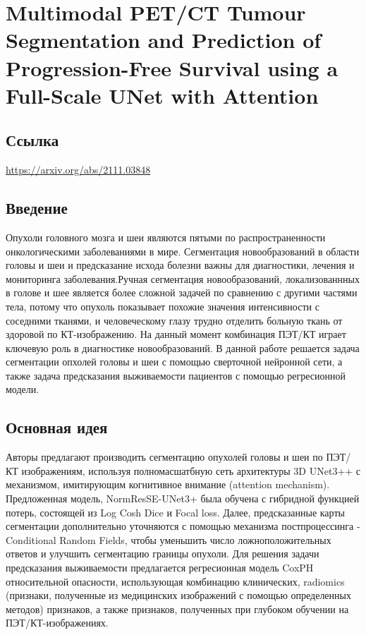 \section{Multimodal PET/CT Tumour
Segmentation and Prediction of
Progression-Free Survival using a
Full-Scale UNet with Attention}

\subsection*{Ссылка} \url{https://arxiv.org/abs/2111.03848}
\subsection*{Введение}
Опухоли головного мозга и шеи являются пятыми по распространенности 
онкологическими заболеваниями в мире. Сегментация новообразований 
в области головы и шеи и предсказание исхода болезни важны 
для диагностики, лечения и мониторинга заболевания.Ручная сегментация
новообразований, локализованнных в голове и шее является более сложной задачей по 
сравнению с другими частями тела, потому что опухоль показывает похожие 
значения интенсивности с соседними тканями, и человеческому глазу трудно отделить 
больную ткань от здоровой по КТ-изображению. На данный момент комбинация ПЭТ/КТ 
играет ключевую роль в диагностике новообразований. В данной работе
решается задача сегментации опхолей головы и шеи с помощью 
сверточной нейронной сети, а также задача предсказания выживаемости пациентов с помощью 
регресионной модели.
\subsection*{Основная идея}
Авторы предлагают производить сегментацию опухолей головы и шеи по ПЭТ/КТ 
изображениям, используя полномасшатбную сеть архитектуры 3D UNet3++ с механизмом,
имитирующим когнитивное внимание (attention mechanism).  Предложенная модель, 
NormResSE-UNet3+ была обучена с гибридной функцией потерь, состоящей из Log Cosh Dice и Focal loss. 
Далее, предсказанные карты сегментации дополнительно уточняются с помощью механизма постпроцессинга -
Conditional Random Fields, чтобы уменьшить число ложноположительных ответов 
и улучшить сегментацию границы опухоли. Для решения задачи предсказания 
выживаемости предлагается регресионная модель CoxPH относительной опасности, использующая 
комбинацию клинических, radiomics (признаки, полученные из медицинских изображений с помощью определенных методов) признаков, а также признаков, полученных при глубоком обучении на ПЭТ/КТ-изображениях.
